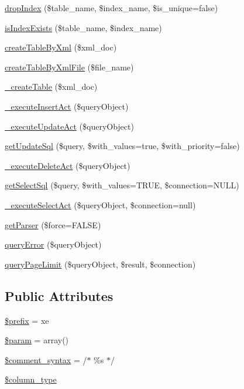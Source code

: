 \begin{DoxyCompactItemize}
\item 
\hyperlink{classDBMssql_a83bea7f71705370699eac384c5f93088}{drop\+Index} (\$table\+\_\+name, \$index\+\_\+name, \$is\+\_\+unique=false)
\item 
\hyperlink{classDBMssql_a17723942b3686527a68b72a1740136c3}{is\+Index\+Exists} (\$table\+\_\+name, \$index\+\_\+name)
\item 
\hyperlink{classDBMssql_a7a3ff51c1a29e47c02f358dc6064d88b}{create\+Table\+By\+Xml} (\$xml\+\_\+doc)
\item 
\hyperlink{classDBMssql_ae136845dee2ecc1bd8fe3a7c535572f4}{create\+Table\+By\+Xml\+File} (\$file\+\_\+name)
\item 
\hyperlink{classDBMssql_a0705365081b34014652f440380c53519}{\+\_\+create\+Table} (\$xml\+\_\+doc)
\item 
\hyperlink{classDBMssql_aa3f04ce5bee8d9e11db7de7293055fef}{\+\_\+execute\+Insert\+Act} (\$query\+Object)
\item 
\hyperlink{classDBMssql_a855a8b1b61f7840ce057f72fa5a39300}{\+\_\+execute\+Update\+Act} (\$query\+Object)
\item 
\hyperlink{classDBMssql_a10dad79ab29a55301ef2327fb27f86aa}{get\+Update\+Sql} (\$query, \$with\+\_\+values=true, \$with\+\_\+priority=false)
\item 
\hyperlink{classDBMssql_a871bd07e7224b27daba828686ee57a8a}{\+\_\+execute\+Delete\+Act} (\$query\+Object)
\item 
\hyperlink{classDBMssql_a37ed6e799c12ecafdea33d6fb0a84f87}{get\+Select\+Sql} (\$query, \$with\+\_\+values=T\+R\+UE, \$connection=N\+U\+LL)
\item 
\hyperlink{classDBMssql_a819a9181e9f34ce00f6f2d8a273813a6}{\+\_\+execute\+Select\+Act} (\$query\+Object, \$connection=null)
\item 
\hyperlink{classDBMssql_aa67e4dcd0df911a7c4e6325f21f0fb04}{get\+Parser} (\$force=F\+A\+L\+SE)
\item 
\hyperlink{classDBMssql_adeea6fd6090140a4b81051c5ff68cdfe}{query\+Error} (\$query\+Object)
\item 
\hyperlink{classDBMssql_a5a63ce969c396b656ac50e2251e798b9}{query\+Page\+Limit} (\$query\+Object, \$result, \$connection)
\end{DoxyCompactItemize}
\subsection*{Public Attributes}
\begin{DoxyCompactItemize}
\item 
\hyperlink{classDBMssql_a733cd192b424b5a66ea14e3e62391844}{\$prefix} = \textquotesingle{}xe\textquotesingle{}
\item 
\hyperlink{classDBMssql_a352ee40852cea6dc20de096486603805}{\$param} = array()
\item 
\hyperlink{classDBMssql_ad095d953d508f44a326586a10c95336d}{\$comment\+\_\+syntax} = \textquotesingle{}/$\ast$ \%s $\ast$/\textquotesingle{}
\item 
\hyperlink{classDBMssql_a785e589df00c87bb0003b573aa5d7fee}{\$column\+\_\+type}
\end{DoxyCompactItemize}
